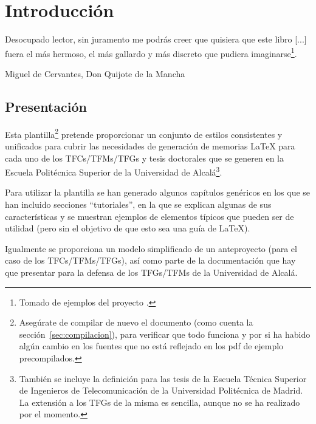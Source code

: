 {
  \chapter{Introducción}
  \label{cha:introduccion}

  \begin{FraseCelebre}
    \begin{Frase}
      Desocupado lector, sin juramento me podrás creer que quisiera que este libro [...] fuera el más hermoso, el más gallardo y más discreto que pudiera imaginarse\footnote{Tomado de ejemplos del proyecto \texis{}.}.
    \end{Frase}
    \begin{Fuente}
      Miguel de Cervantes, Don Quijote de la Mancha
    \end{Fuente}
  \end{FraseCelebre}


  \section{Presentación}
  \label{sec:presentacion}

  Esta plantilla\footnote{Asegúrate de compilar de nuevo el documento (como cuenta la sección~\ref{sec:compilacion}), para verificar que todo funciona y por si ha habido algún cambio en los fuentes que no está reflejado en los pdf de ejemplo precompilados.} pretende proporcionar un conjunto de estilos consistentes y unificados para cubrir las necesidades de generación de memorias \LaTeX{} para cada uno de los TFCs/TFMs/TFGs y tesis doctorales que se generen en la Escuela Politécnica Superior de la Universidad de Alcalá\footnote{También se incluye la definición para las tesis de la Escuela Técnica Superior de Ingenieros de Telecomunicación de la Universidad Politécnica de Madrid. La extensión a los TFGs de la misma es sencilla, aunque no se ha realizado por el momento.}.

  Para utilizar la plantilla se han generado algunos capítulos genéricos en los que se han incluido secciones ``tutoriales'', en la que se explican algunas de sus características y se muestran ejemplos de elementos típicos que pueden ser de utilidad (pero sin el objetivo de que esto sea una guía de \LaTeX{}).

  Igualmente se proporciona un modelo simplificado de un anteproyecto (para el caso de los TFCs/TFMs/TFGs), así como parte de la documentación que hay que presentar para la defensa de los TFGs/TFMs de la Universidad de Alcalá.



}

